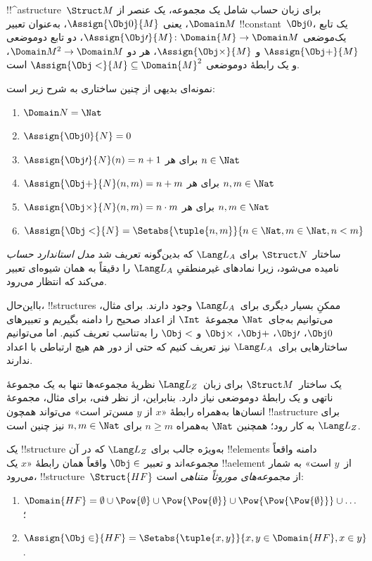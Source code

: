 \documentclass[../../../include/open-logic-section]{subfiles}
\begin{document}
\begin{ex}
!!^a{structure}~$\Struct M$ برای زبان حساب شامل یک مجموعه،
یک عنصر از $\Domain M$، یعنی $\Assign{\Obj 0}{M}$، به‌عنوان تعبیر
!!{constant}~$\Obj 0$، یک تابع یک‌موضعی
$\Assign{\Obj \prime}{M} \colon \Domain{M} \to \Domain M$، دو تابع
دوموضعی $\Assign{\Obj +}{M}$ و $\Assign{\Obj
  \times}{M}$، هر دو $\Domain M^2 \to \Domain M$، و
یک رابطهٔ دوموضعی $\Assign{\Obj <}{M} \subseteq \Domain{M}^2$ است.

نمونه‌ای بدیهی از چنین ساختاری به شرح زیر است:
\begin{enumerate}
\item $\Domain N = \Nat$
\item $\Assign{\Obj 0}{N} = 0$
\item $\Assign{\Obj \prime}{N}(n) = n + 1$ برای هر $n \in \Nat$
\item $\Assign{\Obj +}{N}(n, m) = n + m$ برای هر $n, m \in \Nat$
\item $\Assign{\Obj \times}{N}(n, m) = n\cdot m$ برای هر $n, m \in \Nat$
\item $\Assign{\Obj <}{N} = \Setabs{\tuple{n, m}}{n \in \Nat, m \in
  \Nat, n < m}$
\end{enumerate}
ساختار~$\Struct N$ برای $\Lang L_A$ که بدین‌گونه تعریف شد
\emph{مدل استاندارد حساب} نامیده می‌شود، زیرا نمادهای غیرمنطقیِ
$\Lang L_A$ را دقیقاً به همان شیوه‌ای تعبیر می‌کند که انتظار می‌رود.

بااین‌حال، !!{structure}s ممکنِ بسیار دیگری برای~$\Lang L_A$ وجود
دارند. برای مثال، می‌توانیم به‌جای~$\Nat$ مجموعهٔ~$\Int$ از اعداد صحیح
را دامنه بگیریم و تعبیرهای $\Obj 0$، $\Obj \prime$، $\Obj +$،
$\Obj \times$ و $\Obj <$ را به‌تناسب تعریف کنیم. اما می‌توانیم
ساختارهایی برای~$\Lang L_A$ نیز تعریف کنیم که حتی از دور هم هیچ
ارتباطی با اعداد ندارند.
\end{ex}

\begin{ex}
یک ساختار~$\Struct M$ برای زبان~$\Lang L_Z$ نظریهٔ مجموعه‌ها تنها به
یک مجموعهٔ ناتهی و یک رابطهٔ دوموضعی نیاز دارد. بنابراین، از نظر فنی،
برای مثال، مجموعهٔ انسان‌ها به‌همراه رابطهٔ «$x$ از $y$ مسن‌تر است»
می‌تواند همچون !!a{structure} برای $\Lang L_Z$ به کار رود؛ همچنین
$\Nat$ به‌همراه $n \ge m$ برای $n, m \in \Nat$ نیز چنین است.

یک !!{structure} به‌ویژه جالب برای $\Lang L_Z$ که در آن !!{element}s
دامنه واقعاً مجموعه‌اند و تعبیر $\Obj \in$ واقعاً همان رابطهٔ
«$x$ یک !!a{element} از~$y$ است» به شمار می‌رود، !!{structure}~$\Struct{{HF}}$
از \emph{مجموعه‌های موروثاً متناهی} است:
\begin{enumerate}
\item $\Domain{{{HF}}} = \emptyset \cup \Pow{\emptyset} \cup
  \Pow{\Pow{\emptyset}} \cup \Pow{\Pow{\Pow{\emptyset}}} \cup \dots$؛
\item $\Assign{\Obj \in}{{{HF}}} = \Setabs{\tuple{x, y}}{x, y \in
  \Domain{{{HF}}}, x \in y}$.
\end{enumerate}
\end{ex}
\end{document}
